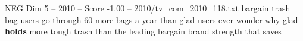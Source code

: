 \begin{textsample}{NEG Dim 5 – 2010 – Score -1.00 – 2010/tv\_com\_2010\_118.txt}  \label{ex:f5_neg_028}
bargain trash bag users go through 60 more bags a year than glad users ever wonder why glad \textbf{holds} more tough trash than the leading bargain brand strength that saves

\end{textsample}

